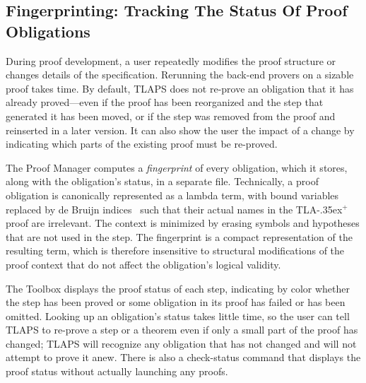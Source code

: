 \documentclass[a4paper]{llncs}
\newcommand{\tlaplus}{\mbox{TLA\kern -.35ex$^+$}\xspace}
\begin{document}
\subsection{Fingerprinting: Tracking The Status Of Proof Obligations}
\label{sec:fingerprinting}

During proof development, a user repeatedly modifies the proof structure or changes
details of the specification. Rerunning the back-end provers on a sizable proof
takes time. 
By default, TLAPS does not re-prove an obligation that it has already
proved---even if the proof has been reorganized and the step that generated it
has been moved, or if the step was removed from the proof and reinserted in a
later version.  
It can also show the user the impact of a change by
indicating which parts of the existing proof must be re-proved.

The Proof Manager computes a \emph{fingerprint} of every obligation, 
which it
stores, along with the obligation's status, in a separate file. Technically, a proof
obligation is canonically represented as a lambda term, 
with bound variables
replaced by de Bruijn indices~\cite{deBruijn72} such that their actual names in the
\tlaplus proof are irrelevant. The context is minimized by erasing symbols and
hypotheses that are not used in the step. The fingerprint is a compact representation
of the resulting term, which is therefore insensitive
to structural modifications of the proof context that do not affect the obligation's logical
validity.

The Toolbox displays the proof status of each step, indicating by
color whether the step has been proved or some obligation in its proof
has failed or has been omitted.
Looking up an obligation's status takes little time, so the user can tell TLAPS
to re-prove a step or a theorem even if only a small part of the proof has
changed; TLAPS will recognize any obligation that has not changed and
will not attempt to prove it anew.
There is also a check-status command that displays the proof status without
actually launching any proofs. 
\end{document}
